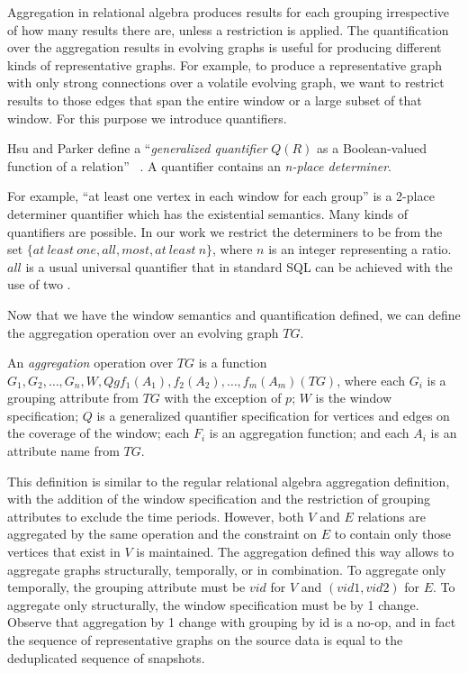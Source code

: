 Aggregation in relational algebra produces results for each grouping
irrespective of how many results there are, unless a 
restriction is applied.  The quantification over the aggregation
results in evolving graphs is useful for producing different kinds of
representative graphs.  For example, to produce a representative graph
with only strong connections over a volatile evolving graph, we want
to restrict results to those edges that span the entire window or a
large subset of that window.  For this purpose we introduce
quantifiers.

Hsu and Parker define a ``{\em generalized quantifier} $Q(R)$ as a
Boolean-valued function of a relation'' ~\cite{Hsu1995}.  A quantifier
contains an {\em n-place determiner}.

For example, ``at least one vertex in each window for each group'' is
a 2-place determiner quantifier which has the existential semantics.
Many kinds of quantifiers are possible.  In our work we restrict the
determiners to be from the set $\{at\ least\ one, all, most,
at\ least\ n\}$, where $n$ is an integer representing a ratio.  $all$
is a usual universal quantifier that in standard SQL can be achieved
with the use of two .

Now that we have the window semantics and quantification defined, we
can define the aggregation operation over an evolving graph $TG$.

\begin{definition}
An {\em aggregation} operation over $TG$ is a function \\ $G_1, G_2,
\ldots, G_n, W, Q g f_1(A_1), f_2(A_2), \ldots, f_m(A_m)(TG)$, where
each $G_i$ is a grouping attribute from $TG$ with the exception of
$p$; $W$ is the window specification; $Q$ is a generalized quantifier
specification for vertices and edges on the coverage of the window;
each $F_i$ is an aggregation function; and each $A_i$ is an attribute
name from $TG$.
\label{def:agg}
\end{definition}

This definition is similar to the regular relational algebra
aggregation definition, with the addition of the window specification
and the restriction of grouping attributes to exclude the time
periods.  However, both $V$ and $E$ relations are aggregated by the
same operation and the constraint on $E$ to contain only those
vertices that exist in $V$ is maintained.  The aggregation defined
this way allows to aggregate graphs structurally, temporally, or in
combination.  To aggregate only temporally, the grouping attribute
must be $vid$ for $V$ and $(vid1, vid2)$ for $E$.  To aggregate only
structurally, the window specification must be by 1 change.  Observe
that aggregation by 1 change with grouping by id is a no-op, and in
fact the sequence of representative graphs on the source data is equal
to the deduplicated sequence of snapshots.


